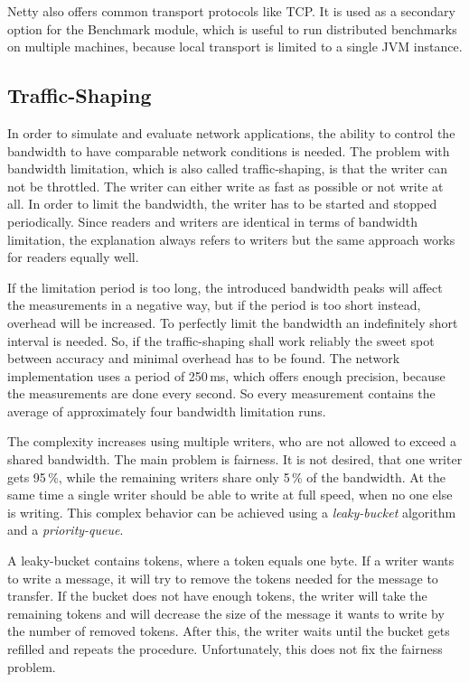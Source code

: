Netty also offers common transport protocols like TCP. It is used as a secondary option for the Benchmark module, which is useful to run distributed benchmarks on multiple machines, because local transport is limited to a single JVM instance.


\subsection{Traffic-Shaping}
In order to simulate and evaluate network applications, the ability to control the bandwidth to have comparable network conditions is needed. The problem with bandwidth limitation, which is also called traffic-shaping, is that the writer can not be throttled. The writer can either write as fast as possible or not write at all. In order to limit the bandwidth, the writer has to be started and stopped periodically. Since readers and writers are identical in terms of bandwidth limitation, the explanation always refers to writers but the same approach works for readers equally well.

If the limitation period is too long, the introduced bandwidth peaks will affect the measurements in a negative way, but if the period is too short instead, overhead will be increased. To perfectly limit the bandwidth an indefinitely short interval is needed. So, if the traffic-shaping shall work reliably the sweet spot between accuracy and minimal overhead has to be found. The network implementation uses a period of 250\,ms, which offers enough precision, because the measurements are done every second. So every measurement contains the average of approximately four bandwidth limitation runs.

The complexity increases using multiple writers, who are not allowed to exceed a shared bandwidth. The main problem is fairness. It is not desired, that one writer gets 95\,\%, while the remaining writers share only 5\,\% of the bandwidth. At the same time a single writer should be able to write at full speed, when no one else is writing. This complex behavior can be achieved using a \emph{leaky-bucket} algorithm and a \emph{priority-queue}.

A leaky-bucket contains tokens, where a token equals one byte. If a writer wants to write a message, it will try to remove the tokens needed for the message to transfer. If the bucket does not have enough tokens, the writer will take the remaining tokens and will decrease the size of the message it wants to write by the number of removed tokens. After this, the writer waits until the bucket gets refilled and repeats the procedure. Unfortunately, this does not fix the fairness problem.

